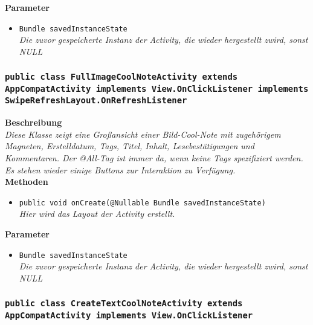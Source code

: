 \documentclass[a4paper]{scrreprt}
\begin{document}
                \textbf{Parameter}
                \begin{itemize}
        		\item\texttt{Bundle savedInstanceState}\\ 
                \textit{Die zuvor gespeicherte Instanz der Activity, die wieder hergestellt zwird, sonst NULL}\\
                \end{itemize} 
        
        \subsubsection{\texttt{public class FullImageCoolNoteActivity extends AppCompatActivity implements View.OnClickListener implements SwipeRefreshLayout.OnRefreshListener}}
               
               	\textbf{Beschreibung} \\
      	        \textit{Diese Klasse zeigt eine Großansicht einer Bild-Cool-Note mit zugehörigem Magneten, Erstelldatum, Tags, Titel, Inhalt, Lesebestätigungen und Kommentaren. Der @All-Tag ist immer da, wenn keine Tags spezifiziert werden. Es stehen wieder einige Buttons zur Interaktion zu Verfügung.} \\
                
                \textbf{Methoden}
                \begin{itemize}
        		\item\texttt{{public void onCreate(@Nullable Bundle savedInstanceState)}}\\
                \textit{Hier wird das Layout der Activity erstellt.}\\
                \end{itemize}
                
                \textbf{Parameter}
                \begin{itemize}
        		\item\texttt{Bundle savedInstanceState}\\ 
                \textit{Die zuvor gespeicherte Instanz der Activity, die wieder hergestellt zwird, sonst NULL}\\
                \end{itemize} 
                
        \subsubsection{\texttt{public class CreateTextCoolNoteActivity extends AppCompatActivity implements View.OnClickListener}}
               
\end{document}
